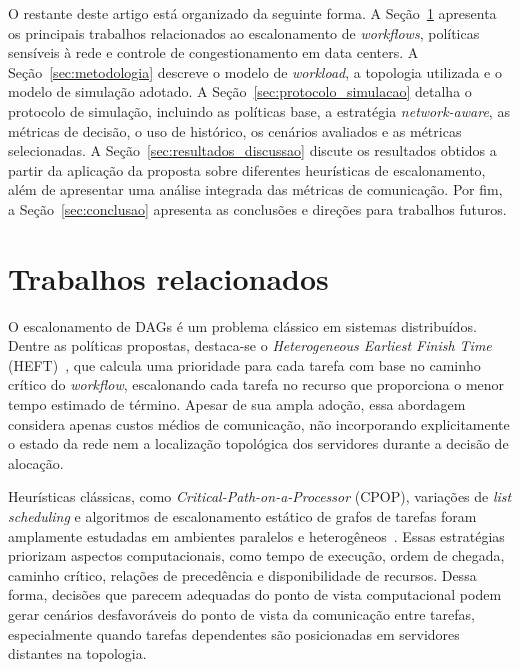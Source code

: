 \documentclass[12pt]{article}
\begin{document}
O restante deste artigo está organizado da seguinte forma. 
%
A Seção~\ref{sec:trabalhos_relacionados} apresenta os principais trabalhos relacionados ao escalonamento de \textit{workflows}, políticas sensíveis à rede e controle de congestionamento em data centers. 
%
A Seção~\ref{sec:metodologia} descreve o modelo de \textit{workload}, a topologia utilizada e o modelo de simulação adotado. 
%
A Seção~\ref{sec:protocolo_simulacao} detalha o protocolo de simulação, incluindo as políticas base, a estratégia \textit{network-aware}, as métricas de decisão, o uso de histórico, os cenários avaliados e as métricas selecionadas. 
%
A Seção~\ref{sec:resultados_discussao} discute os resultados obtidos a partir da aplicação da proposta sobre diferentes heurísticas de escalonamento, além de apresentar uma análise integrada das métricas de comunicação. 
%
Por fim, a Seção~\ref{sec:conclusao} apresenta as conclusões e direções para trabalhos futuros.





\section{Trabalhos relacionados}
\label{sec:trabalhos_relacionados}

O escalonamento de DAGs é um problema clássico em sistemas distribuídos. 
%
Dentre as políticas propostas, destaca-se o \textit{Heterogeneous Earliest Finish Time} (HEFT)~\cite{topcuoglu2002performance}, que calcula uma prioridade para cada tarefa com base no caminho crítico do \textit{workflow}, escalonando cada tarefa no recurso que proporciona o menor tempo estimado de término. 
%
Apesar de sua ampla adoção, essa abordagem considera apenas custos médios de comunicação, não incorporando explicitamente o estado da rede nem a localização topológica dos servidores durante a decisão de alocação.

Heurísticas clássicas, como \textit{Critical-Path-on-a-Processor} (CPOP), variações de \textit{list scheduling} e algoritmos de escalonamento estático de grafos de tarefas foram amplamente estudadas em ambientes paralelos e heterogêneos~\cite{graham1979optimization,kwok1999static}. 
%
Essas estratégias priorizam aspectos computacionais, como tempo de execução, ordem de chegada, caminho crítico, relações de precedência e disponibilidade de recursos. 
%
Dessa forma, decisões que parecem adequadas do ponto de vista computacional podem gerar cenários desfavoráveis do ponto de vista da comunicação entre tarefas, especialmente quando tarefas dependentes são posicionadas em servidores distantes na topologia.
\end{document}
